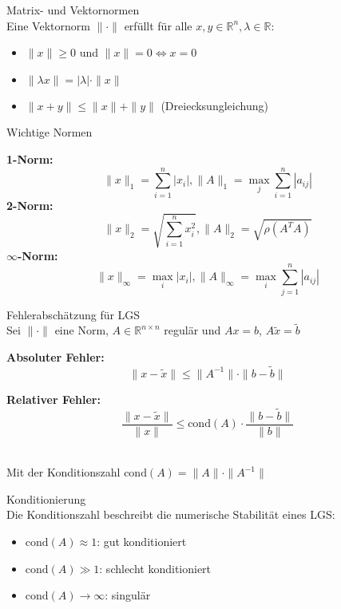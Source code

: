 \begin{definition}{Matrix- und Vektornormen}\\
Eine Vektornorm $\|\cdot\|$ erfüllt für alle $x,y \in \mathbb{R}^n, \lambda \in \mathbb{R}$:
\begin{itemize}
    \item $\|x\| \geq 0$ und $\|x\| = 0 \Leftrightarrow x = 0$
    \item $\|\lambda x\| = |\lambda| \cdot \|x\|$
    \item $\|x + y\| \leq \|x\| + \|y\|$ (Dreiecksungleichung)
\end{itemize}
\end{definition}

\begin{concept}{Wichtige Normen}

\textbf{1-Norm:}
        $$\|x\|_1 = \sum_{i=1}^n |x_i|,
        \|A\|_1 = \max_j \sum_{i=1}^n |a_{ij}|$$
\textbf{2-Norm:}
        $$\|x\|_2 = \sqrt{\sum_{i=1}^n x_i^2}, 
        \|A\|_2 = \sqrt{\rho(A^TA)}$$
$\infty$\textbf{-Norm:}
        $$\|x\|_\infty = \max_i |x_i|, 
        \|A\|_\infty = \max_i \sum_{j=1}^n |a_{ij}|$$
\end{concept}

\begin{theorem}{Fehlerabschätzung für LGS}\\
Sei $\|\cdot\|$ eine Norm, $A \in \mathbb{R}^{n\times n}$ regulär und $Ax = b$, $A\tilde{x} = \tilde{b}$
\vspace{1mm}\\
\begin{minipage}[t]{0.47\textwidth}
    \textbf{Absoluter Fehler:}\\
    $$\|x - \tilde{x}\| \leq \|A^{-1}\| \cdot \|b - \tilde{b}\|$$
\end{minipage}
\hspace{2mm}
\begin{minipage}[t]{0.47\textwidth}
    \textbf{Relativer Fehler:}\\
    $$\frac{\|x - \tilde{x}\|}{\|x\|} \leq \text{cond}(A) \cdot \frac{\|b - \tilde{b}\|}{\|b\|}$$
\end{minipage}
\vspace{1mm}\\
Mit der Konditionszahl $\text{cond}(A) = \|A\| \cdot \|A^{-1}\|$
\end{theorem}

\begin{concept}{Konditionierung}\\
Die Konditionszahl beschreibt die numerische Stabilität eines LGS:
\begin{itemize}
    \item $\text{cond}(A) \approx 1$: gut konditioniert
    \item $\text{cond}(A) \gg 1$: schlecht konditioniert
    \item $\text{cond}(A) \to \infty$: singulär
\end{itemize}
\end{concept}

